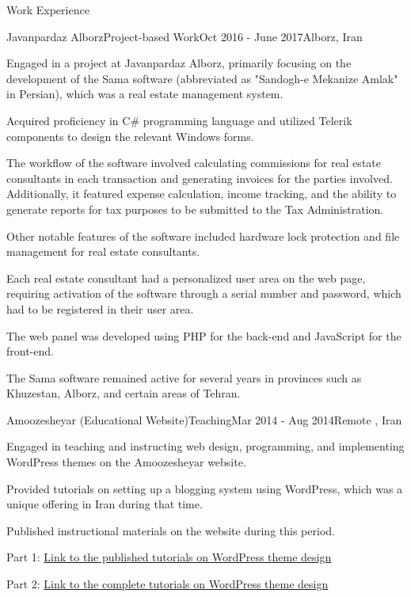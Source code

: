 \documentclass[]{kyvernitis-resume}
\begin{document}
\begin{section}{Work Experience}
    \begin{subsection}{Javanpardaz Alborz}{Project-based Work}{Oct 2016 - June 2017}{Alborz, Iran}
	\item Engaged in a project at Javanpardaz Alborz, primarily focusing on the development of the Sama software (abbreviated as "Sandogh-e Mekanize Amlak" in Persian), which was a real estate management system.
	\item Acquired proficiency in C\# programming language and utilized Telerik components to design the relevant Windows forms.
	\item The workflow of the software involved calculating commissions for real estate consultants in each transaction and generating invoices for the parties involved. Additionally, it featured expense calculation, income tracking, and the ability to generate reports for tax purposes to be submitted to the Tax Administration.
	\item Other notable features of the software included hardware lock protection and file management for real estate consultants.
	\item Each real estate consultant had a personalized user area on the web page, requiring activation of the software through a serial number and password, which had to be registered in their user area.
	\item The web panel was developed using PHP for the back-end and JavaScript for the front-end.
	\item The Sama software remained active for several years in provinces such as Khuzestan, Alborz, and certain areas of Tehran.
    \end{subsection}


 \begin{subsection}{Amoozesheyar (Educational Website)}{Teaching}{Mar 2014 - Aug 2014}{Remote , Iran}
	\item Engaged in teaching and instructing web design, programming, and implementing WordPress themes on the Amoozesheyar website.
	\item Provided tutorials on setting up a blogging system using WordPress, which was a unique offering in Iran during that time.
	\item Published instructional materials on the website during this period.
	\item Part 1:  \href{https://www.daneshjooyar.com/%d9%82%d8%b3%d9%85%d8%aa-%d9%86%d9%87%d8%a7%db%8c%db%8c-%d8%b3%d8%b1%db%8c-%d8%a2%d9%85%d9%88%d8%b2%d8%b4%db%8c-%d8%b7%d8%b1%d8%a7%d8%ad%db%8c-%d9%82%d8%a7%d9%84%d8%a8-%d9%88%d8%b1%d8%af%d9%be%d8%b1/}{Link to the published tutorials on WordPress theme design} 
	\item Part 2: \href{https://www.daneshjooyar.com/%d8%a2%d9%85%d9%88%d8%b2%d8%b4-%d8%b7%d8%b1%d8%a7%d8%ad%db%8c-%d9%82%d8%a7%d9%84%d8%a8-%d9%88%d8%b1%d8%af%d9%be%d8%b1%d8%b3-%d8%aa%d9%85%d8%a7%d9%85%db%8c-%d9%82%d8%b3%d9%85%d8%aa-%d9%87%d8%a7-%d9%82/}{Link to the complete tutorials on WordPress theme design}
    \end{subsection}
    
\end{section}
\end{document}
